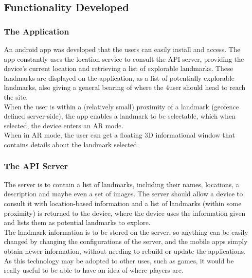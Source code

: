 \subsection{Functionality Developed}
\subsubsection{The Application}
An android app was developed that the users can easily install and access. The app constantly uses the location service to consult the API server, providing the device's current
 location and retrieving a list of explorable landmarks. These landmarks are displayed on the application, as a list of potentially explorable landmarks,
  also giving a general bearing of where the 4user should head to reach the site.\\
 When the user is within a (relatively small) proximity of a landmark (geofence defined server-side), the app enables a landmark to be selectable, which when selected, the device enters an AR mode.\\
 When in AR mode, the user can get a floating 3D informational window that contains details about the landmark selected.
 \subsubsection{The API Server}
 The server is to contain a list of landmarks, including their names, locations, a description and maybe even a set of images. The server should allow a device to consult it with
 location-based information and a list of landmarks (within some proximity) is returned to the device, where the device uses the information given and lists them as potential landmarks to explore.\\
 The landmark information is to be stored on the server, so anything can be easily changed by changing the configurations of the server, and the mobile apps simply obtain newer information, 
 without needing to rebuild or update the applications. As this technology may be adopted to other uses, such as games, it would be really useful to be able to have an idea of where 
 players are.